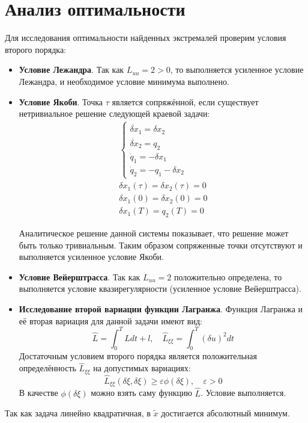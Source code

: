 \documentclass[a4paper,12pt]{article}
\begin{document}
\section*{Анализ оптимальности}
Для исследования оптимальности найденных экстремалей проверим условия второго порядка:
\begin{itemize}
  \item \textbf{Условие Лежандра}. Так как \(L_{uu}=2 > 0\), то выполняется усиленное условие Лежандра, и необходимое условие минимума выполнено.
  \item \textbf{Условие Якоби}. Точка \(\tau\) является сопряжённой, если существует нетривиальное решение следующей краевой задачи:
        \begin{gather*}
          \begin{cases}
            \dot{\delta x}_1=\delta x_2 \\
            \dot{\delta x}_2=q_2        \\
            \dot{q}_1=-\delta x_1       \\
            \dot{q}_2=-q_1 -\delta x_2
          \end{cases}\\
          \delta x_1(\tau)=\delta x_2(\tau)=0 \\
          \delta x_1(0) = \delta x_2(0)=0 \\
          \delta x_1(T) = q_2(T)=0
        \end{gather*}
        
        Аналитическое решение данной системы показывает, что решение может быть только тривиальным. Таким образом сопряженные точки отсутствуют и выполняется усиленное условие Якоби.
  \item \textbf{Условие Вейерштрасса}. Так как \(L_{uu}=2\) положительно определена, то выполняется условие квазирегулярности (усиленное условие Вейерштрасса).
  \item \textbf{Исследование второй вариации функции Лагранжа}. Функция Лагранжа и её вторая вариация для данной задачи имеют вид:
        \begin{equation*}
          \hat{L}=\int_0^TL dt+l,\quad \hat{L}_{\xi\xi}=\int_0^T(\delta u)^2 dt
        \end{equation*}
        Достаточным условием второго порядка является положительная определённость \(\hat{L}_{\xi\xi}\) на допустимых вариациях:
        \begin{equation*}
          \hat{L}_{\xi\xi}(\delta\xi,\delta\xi) \ge \varepsilon \phi(\delta\xi), \quad \varepsilon > 0
        \end{equation*}
        В качестве \(\phi(\delta\xi)\) можно взять саму функцию \(\hat{L}\). Условие выполняется.
\end{itemize}
Так как задача линейно квадратичная, в \(\tilde{x}\) достигается абсолютный минимум.
\end{document}
